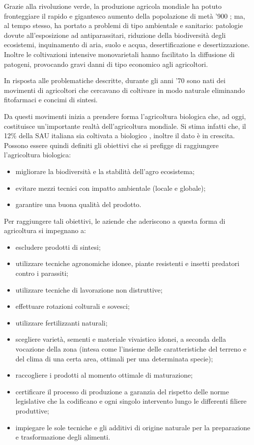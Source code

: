 \documentclass[11pt, a4paper, openright, titlepage, final, language = italian]{book}
\begin{document}
Grazie alla rivoluzione verde, la produzione agricola mondiale ha
potuto fronteggiare il rapido e gigantesco aumento della popolazione
di met\`a '900 \citep{Ciuffoletti_2014}; ma, al tempo stesso, ha
portato a problemi di tipo ambientale e sanitario: patologie dovute
all'esposizione ad antiparassitari, riduzione della biodiversit\`a
degli ecosistemi, inquinamento di aria, suolo e acqua,
desertificazione e desertizzazione. Inoltre le coltivazioni intensive
monovarietali hanno facilitato la diffusione di patogeni, provocando
gravi danni di tipo economico agli agricoltori.

In risposta alle problematiche descritte, durante gli anni '70 sono
nati dei movimenti di agricoltori che cercavano di coltivare in modo
naturale eliminando fitofarmaci e concimi di sintesi.

Da questi movimenti inizia a prendere forma l'agricoltura biologica
che, ad oggi, costituisce un'importante realt\`a dell'agricoltura
mondiale. Si stima infatti che, il 12\% della SAU italiana sia
coltivata a biologico \citep{Bio_cifre}, inoltre il dato è in
crescita.  Possono essere quindi definiti gli obiettivi che si
prefigge di raggiungere l'agricoltura biologica:

\begin{itemize}
\item migliorare la biodiversit\`a e la stabilit\`a dell'agro ecosistema;
\item evitare mezzi tecnici con impatto ambientale (locale e
  globale);
\item garantire una buona qualit\`a del prodotto.
\end{itemize}

Per raggiungere tali obiettivi, le aziende che aderiscono a questa
forma di agricoltura si impegnano a:

\begin{itemize}
\item escludere prodotti di sintesi;
\item utilizzare tecniche agronomiche idonee, piante resistenti
  e insetti predatori contro i parassiti;
\item utilizzare tecniche di lavorazione non
  distruttive;
\item effettuare rotazioni colturali e
  sovesci;
\item utilizzare fertilizzanti naturali;
\item scegliere variet\`a, sementi e materiale vivaistico idonei, a
  seconda della vocazione della zona (intesa come l’insieme delle
  caratteristiche del terreno e del clima di una certa area, ottimali
  per una determinata specie);
\item raccogliere i prodotti al momento ottimale di maturazione;
\item certificare il processo di produzione a garanzia del rispetto
  delle norme legislative che la codificano e ogni singolo intervento
  lungo le differenti filiere produttive;
\item impiegare le sole tecniche e gli additivi di origine naturale
  per la preparazione e trasformazione degli alimenti.
\end{itemize}
\end{document}
